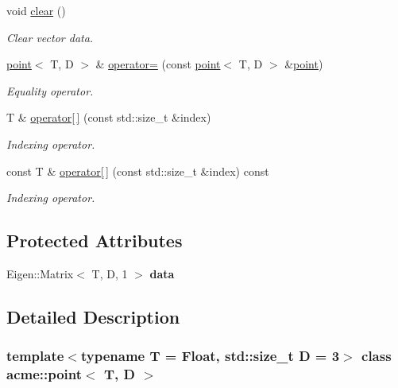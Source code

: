 \begin{DoxyCompactItemize}
\mbox{\label{classacme_1_1point_a72a37be7ec9417b12eeec1a31ed0398b}} 
void \hyperlink{classacme_1_1point_a72a37be7ec9417b12eeec1a31ed0398b}{clear} ()
\begin{DoxyCompactList}\small\item\em Clear vector data. \end{DoxyCompactList}\item 
\hyperlink{classacme_1_1point}{point}$<$ T, D $>$ \& \hyperlink{classacme_1_1point_a86eae9e4a5cca7bb30cdc26a745e75c2}{operator=} (const \hyperlink{classacme_1_1point}{point}$<$ T, D $>$ \&\hyperlink{classacme_1_1point}{point})
\begin{DoxyCompactList}\small\item\em Equality operator. \end{DoxyCompactList}\item 
T \& \hyperlink{classacme_1_1point_ac8fee17f41cb01f10ecb082921018155}{operator\mbox{[}$\,$\mbox{]}} (const std\+::size\+\_\+t \&index)
\begin{DoxyCompactList}\small\item\em Indexing operator. \end{DoxyCompactList}\item 
const T \& \hyperlink{classacme_1_1point_a5e3a5ca9538fcdb337127d27fcecc2b6}{operator\mbox{[}$\,$\mbox{]}} (const std\+::size\+\_\+t \&index) const
\begin{DoxyCompactList}\small\item\em Indexing operator. \end{DoxyCompactList}\end{DoxyCompactItemize}
\subsection*{Protected Attributes}
\begin{DoxyCompactItemize}
\item 
\mbox{\label{classacme_1_1point_a7532a61c7031fddbef1ea217cd916c4c}} 
Eigen\+::\+Matrix$<$ T, D, 1 $>$ {\bfseries data}
\end{DoxyCompactItemize}


\subsection{Detailed Description}
\subsubsection*{template$<$typename T = Float, std\+::size\+\_\+t D = 3$>$\newline
class acme\+::point$<$ T, D $>$}

